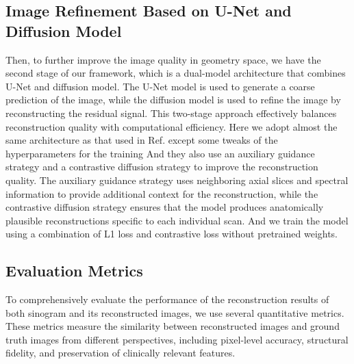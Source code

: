 \documentclass[12pt]{iopart}
\begin{document}
\subsection{Image Refinement Based on U-Net and Diffusion Model}
\label{sec:diffusion_model}
Then, to further improve the image quality in geometry space, we have the second stage of our framework, which is a dual-model architecture that combines U-Net and diffusion model. The U-Net model is used to generate a coarse prediction of the image, while the diffusion model is used to refine the image by reconstructing the residual signal. This two-stage approach effectively balances reconstruction quality with computational efficiency.
Here we adopt almost the same architecture as that used in Ref. \cite{han2023} except some tweaks of the hyperparameters for the training
And they also use an auxiliary guidance strategy and a contrastive diffusion strategy to improve the reconstruction quality. The auxiliary guidance strategy uses neighboring axial slices and spectral information to provide additional context for the reconstruction, while the contrastive diffusion strategy ensures that the model produces anatomically plausible reconstructions specific to each individual scan. 
And we train the model using a combination of L1 loss and contrastive loss without pretrained weights. 

\subsection{Evaluation Metrics}

To comprehensively evaluate the performance of the reconstruction results of both sinogram and its reconstructed images, we use several quantitative metrics. These metrics measure the similarity between reconstructed images and ground truth images from different perspectives, including pixel-level accuracy, structural fidelity, and preservation of clinically relevant features.

\end{document}
